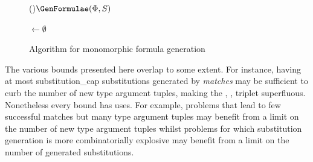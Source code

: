 \documentclass[runningheads]{llncs}
\begin{document}
\begin{figure}[t!]
\begin{algorithm}[H]
\Fn(){\(\GenFormulae(\Phi, S)\)}{




   \BlankLine

   \NewFormulae \(\leftarrow\emptyset\)\;

   \BlankLine


   \BlankLine

   \Return \NewFormulae
}
\end{algorithm}
\caption{Algorithm for monomorphic formula generation}
\label{gen_formulae}
\end{figure}


The various bounds presented here overlap to some extent. For instance, having at most \textcolor{ourblueviolet}{substitution\_cap} substitutions generated by \emph{matches} may be sufficient to curb the number of new type argument tuples, making the \textcolor{ourblueviolet}{\MonoCap}, \textcolor{ourblueviolet}{\MonoMult}, \textcolor{ourblueviolet}{\MonoFloor} triplet superfluous. Nonetheless every bound has uses. For example, problems that lead to few successful matches but many type argument tuples may benefit from a limit on the number of new type argument tuples whilst problems for which substitution generation is more combinatorially explosive may benefit from a limit on the number of generated substitutions.
\end{document}
